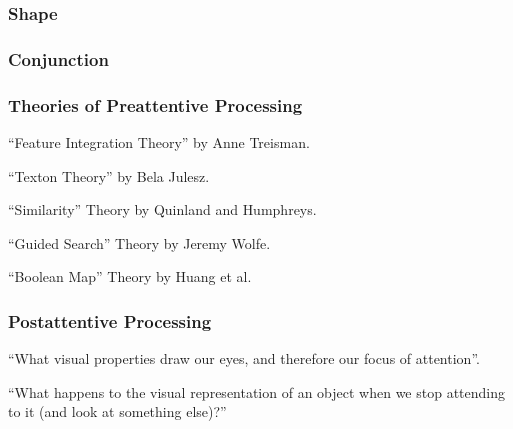 \documentclass[12pt]{beamer}\usepackage[]{graphicx}\usepackage[]{color}
\begin{document}

\begin{frame}
\frametitle{Shape}
\begin{center}
\end{center}
\end{frame}


\begin{frame}
\frametitle{Conjunction}
\begin{center}
\end{center}
\end{frame}


\begin{frame}
\frametitle{Theories of Preattentive Processing}

\bbi
  \item ``Feature Integration Theory'' by Anne Treisman.
  \item ``Texton Theory'' by Bela Julesz.
  \item ``Similarity'' Theory by Quinland and Humphreys.
  \item ``Guided Search'' Theory by Jeremy Wolfe.
  \item ``Boolean Map'' Theory by Huang et al.
\ei

\end{frame}


\begin{frame}
\begin{center}
\Huge{}
\end{center}
\end{frame}


\begin{frame}
\frametitle{Postattentive Processing}

``What visual properties draw our eyes,
and therefore our focus of attention''.
\eb

\vspace{1cm}

``What happens to the visual representation of
an object when we stop attending to it (and look at something else)?''
\eb

\end{frame}
\end{document}
